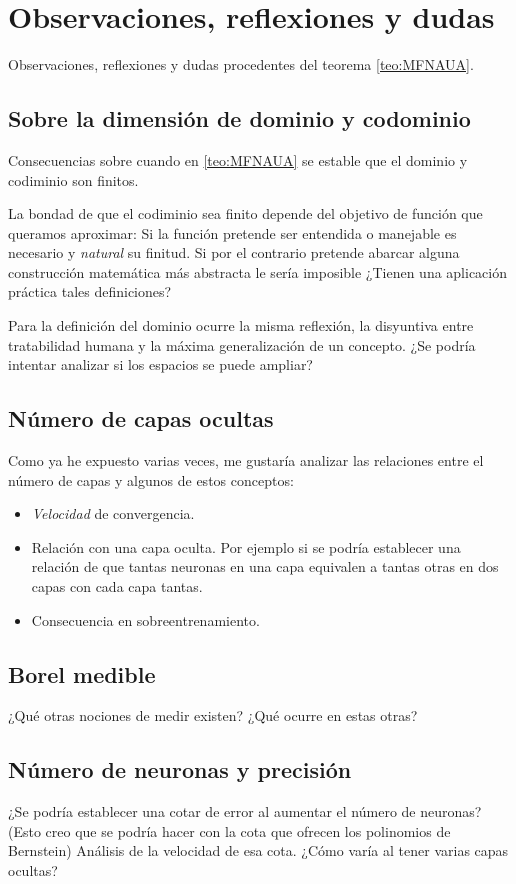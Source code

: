 %

\section{Observaciones, reflexiones y dudas} 

Observaciones, reflexiones y dudas procedentes del teorema \ref{teo:MFNAUA}. 

\subsection{Sobre la dimensión de dominio y codominio} 

Consecuencias sobre cuando en \ref{teo:MFNAUA} se estable que el dominio y codiminio son finitos. 

La bondad de que el codiminio sea finito depende del objetivo de función que queramos aproximar: 
Si la función pretende ser entendida o manejable es necesario y \textit{natural} su finitud. 
Si por el contrario pretende abarcar alguna 
construcción matemática más abstracta le sería imposible ¿Tienen una aplicación práctica tales definiciones?

Para la definición del dominio ocurre la misma reflexión, la disyuntiva entre tratabilidad humana y la máxima generalización de un concepto. 
¿Se podría intentar analizar si los espacios se puede ampliar?  

\subsection{Número de capas ocultas}

Como ya he expuesto varias veces, me gustaría analizar las relaciones entre el número de capas y algunos de estos conceptos: 
\begin{itemize}
    \item   \textit{Velocidad} de convergencia. 
    \item Relación con una capa oculta. Por ejemplo si se podría establecer una relación de que tantas neuronas en una capa equivalen a tantas otras en dos capas con cada capa tantas. 
    \item Consecuencia en sobreentrenamiento. 
\end{itemize}

\subsection{Borel medible}  
¿Qué otras nociones de medir existen? ¿Qué ocurre en estas otras? 

\subsection{Número de neuronas y precisión} 

¿Se podría establecer una cotar de error al aumentar el número de neuronas? 
(Esto creo que se podría hacer con la cota que ofrecen los polinomios de Bernstein)
Análisis de la velocidad de esa cota. 
¿Cómo varía al tener varias capas ocultas? 


